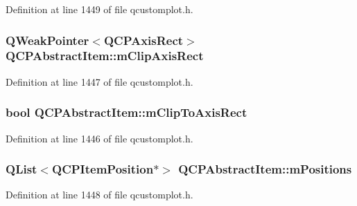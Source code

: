 Definition at line 1449 of file qcustomplot.\-h.

\hypertarget{class_q_c_p_abstract_item_a1af22df15e38a7fa22c0e15a674999f9}{
\subsubsection[{m\-Clip\-Axis\-Rect}]{\setlength{\rightskip}{0pt plus 5cm}Q\-Weak\-Pointer$<${\bf Q\-C\-P\-Axis\-Rect}$>$ Q\-C\-P\-Abstract\-Item\-::m\-Clip\-Axis\-Rect\hspace{0.3cm}{\ttfamily [protected]}}}\label{class_q_c_p_abstract_item_a1af22df15e38a7fa22c0e15a674999f9}


Definition at line 1447 of file qcustomplot.\-h.

\hypertarget{class_q_c_p_abstract_item_ad2a70ff6b658fcb84a9427f69d3f587d}{
\subsubsection[{m\-Clip\-To\-Axis\-Rect}]{\setlength{\rightskip}{0pt plus 5cm}bool Q\-C\-P\-Abstract\-Item\-::m\-Clip\-To\-Axis\-Rect\hspace{0.3cm}{\ttfamily [protected]}}}\label{class_q_c_p_abstract_item_ad2a70ff6b658fcb84a9427f69d3f587d}


Definition at line 1446 of file qcustomplot.\-h.

\hypertarget{class_q_c_p_abstract_item_af94ff71b6a15ea6d028ab8bd8eccd012}{
\subsubsection[{m\-Positions}]{\setlength{\rightskip}{0pt plus 5cm}Q\-List$<${\bf Q\-C\-P\-Item\-Position}$\ast$$>$ Q\-C\-P\-Abstract\-Item\-::m\-Positions\hspace{0.3cm}{\ttfamily [protected]}}}\label{class_q_c_p_abstract_item_af94ff71b6a15ea6d028ab8bd8eccd012}


Definition at line 1448 of file qcustomplot.\-h.

